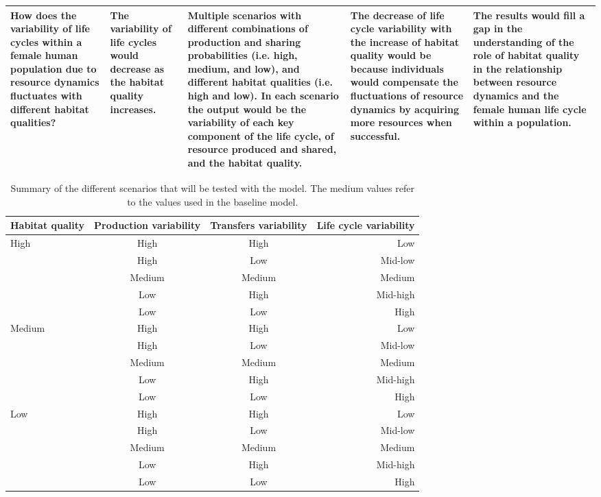 \documentclass{article}
\begin{document}
\begin{table}[H]
\begin{adjustbox}{width=\textwidth}
\begin{tabular}{p{4cm}p{4cm}p{4cm}p{4cm}p{4cm} }
    How does the variability of life cycles within a female human population due to resource dynamics fluctuates with different habitat qualities? & The variability of life cycles would decrease as the habitat quality increases. & Multiple scenarios with different combinations of production and sharing probabilities (i.e. high, medium, and low), and different habitat qualities (i.e. high and low). In each scenario the output would be the variability of each key component of the life cycle, of resource produced and shared, and the habitat quality. &  The decrease of life cycle variability with the increase of habitat quality would be because individuals would compensate the fluctuations of resource dynamics by acquiring more resources when successful. & The results would fill a gap in the understanding of the role of habitat quality in the relationship between resource dynamics and the female human life cycle within a population.\\
    \hline
    \end{tabular}
    \end{adjustbox}
    \label{tab:1}
\end{table}

\begin{table}[H]
    \centering
    \caption{Summary of the different scenarios that will be tested with the model. The medium values refer to the values used in the baseline model.}
    \begin{tabular}{lccr}
    \hline
    Habitat quality & Production variability & Transfers variability & Life cycle variability\\ 
    \hline
    \multirow{5}{*}{High}  & High & High & Low \\
     & High & Low & Mid-low \\
     & Medium & Medium & Medium \\
     & Low & High & Mid-high \\
     & Low & Low & High \\
     \hline
    \multirow{5}{*}{Medium} & High & High & Low \\
     & High & Low & Mid-low \\
     & Medium & Medium & Medium \\
     & Low & High & Mid-high \\
     & Low & Low & High \\
     \hline
    \multirow{5}{*}{Low} & High & High & Low \\
     & High & Low & Mid-low \\
     & Medium & Medium & Medium \\
     & Low & High & Mid-high \\
     & Low & Low & High \\
    \hline
    \end{tabular}
    \label{tab:1}
\end{table}
\end{document}
